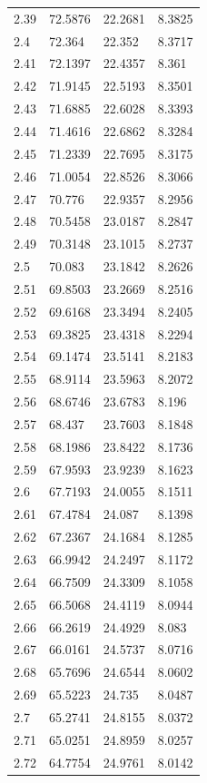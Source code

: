 \begin{tabular}{llll}
2.39 & 72.5876 & 22.2681 & 8.3825 \\
2.4 & 72.364 & 22.352 & 8.3717 \\
2.41 & 72.1397 & 22.4357 & 8.361 \\
2.42 & 71.9145 & 22.5193 & 8.3501 \\
2.43 & 71.6885 & 22.6028 & 8.3393 \\
2.44 & 71.4616 & 22.6862 & 8.3284 \\
2.45 & 71.2339 & 22.7695 & 8.3175 \\
2.46 & 71.0054 & 22.8526 & 8.3066 \\
2.47 & 70.776 & 22.9357 & 8.2956 \\
2.48 & 70.5458 & 23.0187 & 8.2847 \\
2.49 & 70.3148 & 23.1015 & 8.2737 \\
2.5 & 70.083 & 23.1842 & 8.2626 \\
2.51 & 69.8503 & 23.2669 & 8.2516 \\
2.52 & 69.6168 & 23.3494 & 8.2405 \\
2.53 & 69.3825 & 23.4318 & 8.2294 \\
2.54 & 69.1474 & 23.5141 & 8.2183 \\
2.55 & 68.9114 & 23.5963 & 8.2072 \\
2.56 & 68.6746 & 23.6783 & 8.196 \\
2.57 & 68.437 & 23.7603 & 8.1848 \\
2.58 & 68.1986 & 23.8422 & 8.1736 \\
2.59 & 67.9593 & 23.9239 & 8.1623 \\
2.6 & 67.7193 & 24.0055 & 8.1511 \\
2.61 & 67.4784 & 24.087 & 8.1398 \\
2.62 & 67.2367 & 24.1684 & 8.1285 \\
2.63 & 66.9942 & 24.2497 & 8.1172 \\
2.64 & 66.7509 & 24.3309 & 8.1058 \\
2.65 & 66.5068 & 24.4119 & 8.0944 \\
2.66 & 66.2619 & 24.4929 & 8.083 \\
2.67 & 66.0161 & 24.5737 & 8.0716 \\
2.68 & 65.7696 & 24.6544 & 8.0602 \\
2.69 & 65.5223 & 24.735 & 8.0487 \\
2.7 & 65.2741 & 24.8155 & 8.0372 \\
2.71 & 65.0251 & 24.8959 & 8.0257 \\
2.72 & 64.7754 & 24.9761 & 8.0142 \\

\end{tabular}
